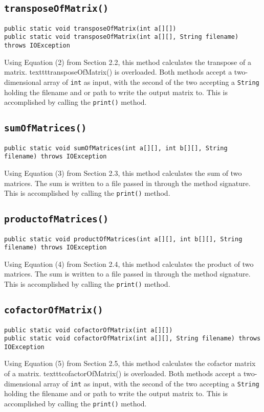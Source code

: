 \documentclass[12pt]{article}
\begin{document}
\subsection{\texttt{transposeOfMatrix()}}
\begin{verbatim}
public static void transposeOfMatrix(int a[][])
public static void transposeOfMatrix(int a[][], String filename) throws IOException
\end{verbatim}
Using Equation (2) from Section 2.2, this method calculates the transpose of a matrix. texttt{transposeOfMatrix()} is overloaded. Both methods accept a two-dimensional array of \texttt{int} as input, with the second of the two accepting a \texttt{String} holding the filename and or path to write the output matrix to. This is accomplished by calling the \texttt{print()} method.

\subsection{\texttt{sumOfMatrices()}}
\begin{verbatim}
public static void sumOfMatrices(int a[][], int b[][], String filename) throws IOException
\end{verbatim}
Using Equation (3) from Section 2.3, this method calculates the sum of two matrices. The sum is written to a file passed in through the method signature. This is accomplished by calling the \texttt{print()} method.

\subsection{\texttt{productofMatrices()}}
\begin{verbatim}
public static void productOfMatrices(int a[][], int b[][], String filename) throws IOException
\end{verbatim}
Using Equation (4) from Section 2.4, this method calculates the product of two matrices. The sum is written to a file passed in through the method signature. This is accomplished by calling the \texttt{print()} method.

\subsection{\texttt{cofactorOfMatrix()}}
\begin{verbatim}
public static void cofactorOfMatrix(int a[][])
public static void cofactorOfMatrix(int a[][], String filename) throws IOException
\end{verbatim}
Using Equation (5) from Section 2.5, this method calculates the cofactor matrix of a matrix. texttt{cofactorOfMatrix()} is overloaded. Both methods accept a two-dimensional array of \texttt{int} as input, with the second of the two accepting a \texttt{String} holding the filename and or path to write the output matrix to. This is accomplished by calling the \texttt{print()} method.
\end{document}
